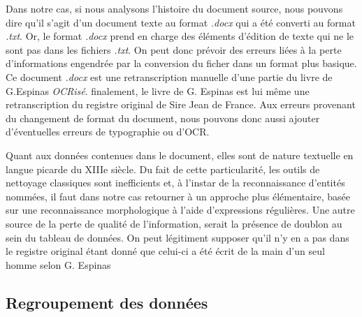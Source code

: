 Dans notre cas, si nous analysons \og l'histoire \fg{} du document source, nous pouvons dire qu'il s'agit d'un document texte au format \textit{.docx} qui  a été converti au format \textit{.txt}. Or, le format \textit{.docx} prend en charge des éléments d'édition de texte qui ne le sont pas dans les fichiers \textit{.txt}. On peut donc prévoir des erreurs liées à la perte d'informations engendrée par la conversion du ficher dans un format plus basique. 
Ce document \textit{.docx} est une retranscription manuelle d'une partie du livre de G.Espinas \textit{OCRisé}.
finalement, le livre de G. Espinas est lui même une retranscription du registre original de Sire Jean de France. Aux erreurs provenant du changement de format du document, nous pouvons donc aussi ajouter d'éventuelles erreurs de typographie ou d'OCR.

Quant aux données contenues dans le document, elles sont de nature textuelle en langue picarde du XIIIe siècle. Du fait de cette particularité, les outils de nettoyage classiques sont inefficients et, à l'instar de la reconnaissance d'entités nommées, il faut dans notre cas retourner à un approche plus élémentaire, basée sur une reconnaissance morphologique à l'aide d'expressions régulières. %
Une autre source de la perte de qualité de l'information, serait la présence de doublon au sein du tableau de données. On peut légitiment supposer qu'il n'y en a pas dans le registre original étant donné que celui-ci a été écrit de la main d'un seul homme selon G. Espinas

\subsection{Regroupement des données}



